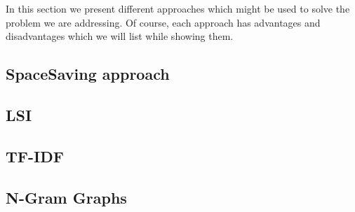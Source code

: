 In this section we present different approaches which might be used to solve the problem we are addressing. Of course, each approach has advantages and disadvantages which we will list while showing them.

\subsection*{SpaceSaving approach}


\subsection*{LSI}


\subsection*{TF-IDF}


\subsection*{N-Gram Graphs}

